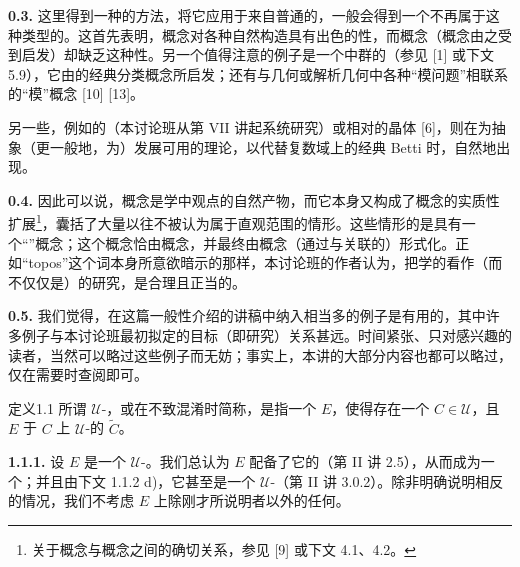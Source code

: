 \textbf{0.3.} 这里得到一种的方法，将它应用于来自普通的，一般会得到一个不再属于这种类型的。这首先表明，概念对各种自然构造具有出色的性，而概念（概念由之受到启发）却缺乏这种性。另一个值得注意的例子是一个中群的（参见 [1] 或下文 5.9），它由的经典分类概念所启发；还有与几何或解析几何中各种“模问题”相联系的“模”概念 [10] [13]。

另一些，例如的（本讨论班从第 VII 讲起系统研究）或相对的晶体
[6]，则在为抽象（更一般地，为）发展可用的理论，以代替复数域上的经典 Betti 时，自然地出现。

\textbf{0.4.} 因此可以说，概念是学中观点的自然产物，而它本身又构成了概念的实质性扩展\footnote{关于概念与概念之间的确切关系，参见 [9] 或下文 4.1、4.2。}，囊括了大量以往不被认为属于直观范围的情形。这些情形的是具有一个“”概念；这个概念恰由概念，并最终由概念（通过与关联的）形式化。正如“topos”这个词本身所意欲暗示的那样，本讨论班的作者认为，把学的看作（而不仅仅是）的研究，是合理且正当的。

\textbf{0.5.} 我们觉得，在这篇一般性介绍的讲稿中纳入相当多的例子是有用的，其中许多例子与本讨论班最初拟定的目标（即研究）关系甚远。时间紧张、只对感兴趣的读者，当然可以略过这些例子而无妨；事实上，本讲的大部分内容也都可以略过，仅在需要时查阅即可。

\begin{SGAresult}{定义}{1.1}
所谓 $\mathcal U$-，或在不致混淆时简称，是指一个 $E$，使得存在一个 $C\in\mathcal U$，且 $E$ 于 $C$ 上 $\mathcal U$-的 $\widetilde C$。
\end{SGAresult}
\textbf{1.1.1.} 设 $E$ 是一个 $\mathcal U$-。我们总认为 $E$ 配备了它的（第 II 讲 2.5），从而成为一个；并且由下文 1.1.2 d)，它甚至是一个 $\mathcal U$-（第 II 讲 3.0.2）。除非明确说明相反的情况，我们不考虑 $E$ 上除刚才所说明者以外的任何。

